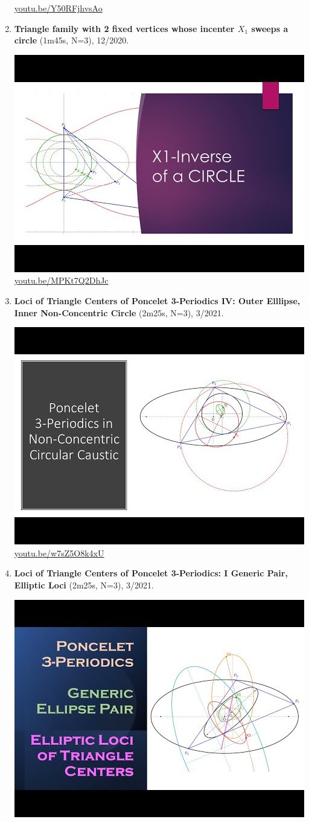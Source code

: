 \documentclass[12pt]{amsart}
\begin{document}
\begin{enumerate}[resume]
\begin{center}
\href{https://youtu.be/Y50RFjhvsAo}{\url{youtu.be/Y50RFjhvsAo}}\end{center}
% 
\item \textbf{Triangle family with 2 fixed vertices whose incenter $X_{1}$ sweeps a circle} (1m45s, N=3), 12/2020. 
\begin{center}\includegraphics[width=.5\textwidth]{pics/MPKt7Q2DhJc.jpg} \\ 
\href{https://youtu.be/MPKt7Q2DhJc}{\url{youtu.be/MPKt7Q2DhJc}}\end{center}
% 
\item \textbf{Loci of Triangle Centers of Poncelet 3-Periodics IV: Outer Elllipse, Inner Non-Concentric Circle} (2m25s, N=3), 3/2021. 
\begin{center}\includegraphics[width=.5\textwidth]{pics/w7sZ5O8k4xU.jpg} \\ 
\href{https://youtu.be/w7sZ5O8k4xU}{\url{youtu.be/w7sZ5O8k4xU}}\end{center}
% 
\item \textbf{Loci of Triangle Centers of Poncelet 3-Periodics: 
I Generic Pair, Elliptic Loci} (2m25s, N=3), 3/2021. 
\begin{center}\includegraphics[width=.5\textwidth]{pics/p1medAei_As.jpg} \\ 

\end{center}
\end{enumerate}
\end{document}
